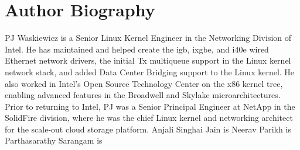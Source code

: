 \documentclass[letterpaper]{article}
\begin{document}



\section{Author Biography}
PJ Waskiewicz is a Senior Linux Kernel Engineer in the Networking Division of Intel. He has maintained and helped create the igb, ixgbe, and i40e wired Ethernet network drivers, the initial Tx multiqueue support in the Linux kernel network stack, and added Data Center Bridging support to the Linux kernel. He also worked in Intel's Open Source Technology Center on the x86 kernel tree, enabling advanced features in the Broadwell and Skylake microarchitectures. Prior to returning to Intel, PJ was a Senior Principal Engineer at NetApp in the SolidFire division, where he was the chief Linux kernel and networking architect for the scale-out cloud storage platform.
\newline
\newline
Anjali Singhai Jain is 
\newline
\newline
Neerav Parikh is
\newline
\newline
Parthasarathy Sarangam is
\end{document}
